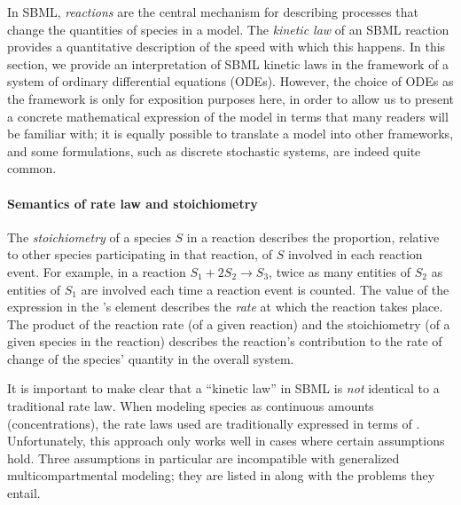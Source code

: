 In SBML, \emph{reactions} are the central mechanism for describing
processes that change the quantities of species in a model.  The
\emph{kinetic law} of an SBML reaction provides a quantitative
description of the speed with which this happens.  In this
section, we provide an interpretation of SBML kinetic laws in the
framework of a system of ordinary differential equations (ODEs).
However, the choice of ODEs as the framework is only for
exposition purposes here, in order to allow us to present a
concrete mathematical expression of the model in terms that many
readers will be familiar with; it is equally possible to translate
a model into other frameworks, and some formulations, such as
discrete stochastic systems, are indeed quite common.


\paragraph{Semantics of rate law and stoichiometry}

The \emph{stoichiometry} of a species $S$ in a reaction describes
the proportion, relative to other species participating in that
reaction, of $S$ involved in each reaction event.  For example, in
a reaction $S_1 + 2 S_2 \rightarrow S_3$, twice as many entities
of $S_2$ as entities of $S_1$ are involved each time a reaction
event is counted.  The value of the expression in the
\KineticLaw's  element describes the \emph{rate} at
which the reaction takes place.  The product of the reaction rate
(of a given reaction) and the stoichiometry (of a given species in
the reaction) describes the reaction's contribution to the rate of
change of the species' quantity in the overall system.

It is important to make clear that a ``kinetic law'' in SBML is
\emph{not} identical to a traditional rate law.  When modeling
species as continuous amounts (\eg concentrations), the rate laws
used are traditionally expressed in terms of
.  Unfortunately, this approach
only works well in cases where certain assumptions hold.  Three
assumptions in particular are incompatible with generalized
multicompartmental modeling; they are listed in
 along with the problems they
entail.

